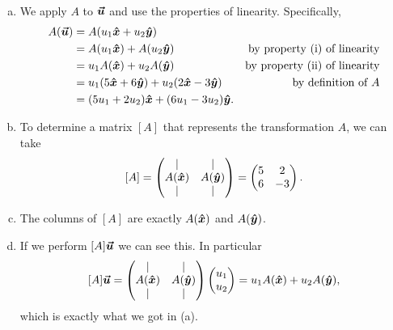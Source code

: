 \documentclass[12pt]{article} %
\begin{document}
\begin{solution}~
    \begin{enumerate}[(a)]
        \item We apply $A$ to $\boldsymbol{\boldsymbol{\vec{u}}}$ and use the properties of linearity. Specifically,
        \begin{align*}
            A(\boldsymbol{\boldsymbol{\vec{u}}}) &= A(u_1 \boldsymbol{\hat{x}} + u_2\boldsymbol{\hat{y}})\\
                &= A(u_1\boldsymbol{\hat{x}}) + A(u_2\boldsymbol{\hat{y}}) & \textrm{by property (i) of linearity}\\
                &= u_1 A(\boldsymbol{\hat{x}}) + u_2A(\boldsymbol{\hat{y}}) & \textrm{by property (ii) of linearity}\\
                &= u_1(5\boldsymbol{\hat{x}} + 6\boldsymbol{\hat{y}}) + u_2(2\boldsymbol{\hat{x}}-3\boldsymbol{\hat{y}}) & \textrm{by definition of $A$}\\
                &= (5u_1 +2u_2)\boldsymbol{\hat{x}} + (6u_1 -3u_2)\boldsymbol{\hat{y}}.
        \end{align*}
        \item To determine a matrix $[A]$ that represents the transformation $A$, we can take
        \[
            [A] = \begin{pmatrix} \vert & \vert \\ A(\boldsymbol{\hat{x}}) & A(\boldsymbol{\hat{y}}) \\ \vert & \vert \end{pmatrix} = \begin{pmatrix} 5 & 2 \\ 6 & -3 \end{pmatrix}.
        \]
        \item The columns of $[A]$ are exactly $A(\boldsymbol{\hat{x}})$ and $A(\boldsymbol{\hat{y}})$.
        \item If we perform $[A]\boldsymbol{\boldsymbol{\vec{u}}}$ we can see this. In particular
        \[
            [A]\boldsymbol{\boldsymbol{\vec{u}}} = \begin{pmatrix} \vert & \vert \\ A(\boldsymbol{\hat{x}}) & A(\boldsymbol{\hat{y}}) \\ \vert & \vert \end{pmatrix} \begin{pmatrix} u_1 \\ u_2 \end{pmatrix} = u_1 A(\boldsymbol{\hat{x}}) + u_2 A(\boldsymbol{\hat{y}}),
        \]
        which is exactly what we got in (a).
    \end{enumerate}
\end{solution}
\end{document}
